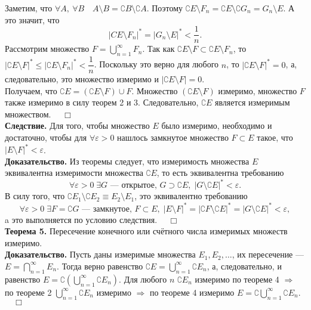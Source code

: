 \documentclass[12pt,a4paper, titlepage]{article}
\begin{document}
Заметим, что $\forall A, \ \forall B \quad A \setminus B = \complement B \setminus \complement A$. Поэтому $\complement E \setminus F_n = \complement E \setminus \complement G_n = G_n \setminus E$. А это значит, что
$$
|CE \setminus F_n|^* = |G_n \setminus E|^* < \frac 1 n.
$$
Рассмотрим множество $F = \bigcup\limits_{n=1}^\infty F_n$. Так как $\complement E \setminus F \subset \complement E \setminus F_n$, то $|\complement E \setminus F|^* \leqslant |\complement E \setminus F_n|^* < \dfrac 1 n$. Поскольку это верно для любого $n$, то $|\complement E \setminus F|^* = 0$, а, следовательно, это множество измеримо и $|\complement E \setminus F| = 0$. \\

Получаем, что $\complement E = (\complement E \setminus F) \cup F$. Множество $(\complement E \setminus F)$ измеримо, множество $F$ также измеримо в силу теорем 2 и 3. Следовательно, $\complement E$ является измеримым множеством. $\quad \Box$\\

\textbf{Следствие.} Для того, чтобы множество $E$ было измеримо, необходимо и достаточно, чтобы для $\forall \varepsilon > 0$ нашлось замкнутое множество $F \subset E$ такое, что $|E \setminus F|^* < \varepsilon$.\\
\textbf{Доказательство.}
Из теоремы следует, что измеримость множества $E$ эквивалентна измеримости множества $\complement E$, то есть эквивалентна требованию
$$
\forall \varepsilon > 0 \;  \exists G \mbox{ --- открытое, } G \supset \complement E, \; |G \setminus \complement E|^*< \varepsilon.
$$
В силу того, что $\complement E_1 \setminus \complement E_2 \equiv E_2 \setminus E_1$, это эквивалентно требованию
$$
\forall \varepsilon > 0 \;  \exists F = \complement G \mbox{ --- замкнутое, } F \subset E, \; |E \setminus F|^* = |\complement F \setminus \complement E|^* = |G \setminus \complement E|^*< \varepsilon,
$$
a это выполняется по условию следствия. $\quad \Box$\\

\textbf{Теорема 5.} Пересечение конечного или счётного числа измеримых множеств измеримо.\\
\textbf{Доказательство.}
Пусть даны измеримые множества $E_1, E_2, \dots$, их пересечение --- $E = \bigcap\limits_{n=1}^\infty E_n$. Тогда верно равенство $\complement E = \bigcup\limits_{n=1}^\infty \complement E_n$, а, следовательно, и равенство $E = \complement (\bigcup\limits_{n=1}^\infty \complement E_n)$. Для любого $n$ $\complement E_n$ измеримо по теореме 4 $\Rightarrow$ по теореме 2 $\bigcup\limits_{n=1}^{\infty}\complement E_n$ измеримо $\Rightarrow$ по теореме 4 измеримо $E = \complement \bigcup\limits_{n=1}^{\infty}\complement E_n$. $\quad \Box$\\
\end{document}
